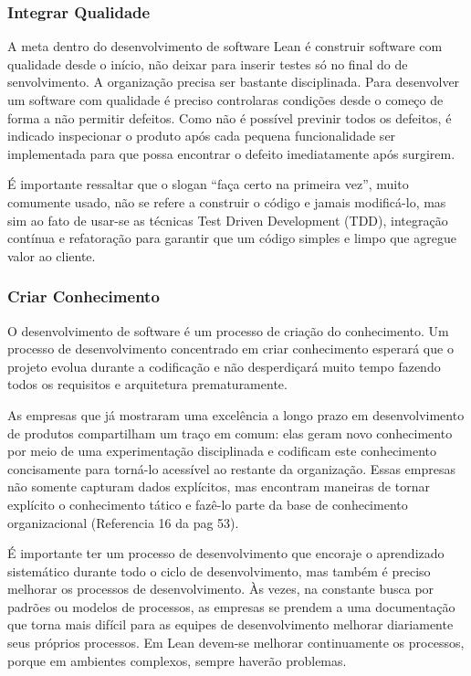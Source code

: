 \subsubsection[Integrar Qualidade]{Integrar Qualidade}

A meta dentro do desenvolvimento de software Lean é construir software com qualidade desde o início, não deixar para inserir testes só no final do de senvolvimento. A organização precisa ser bastante disciplinada. Para desenvolver um software com qualidade é preciso controlaras condições desde o começo de forma a não permitir defeitos. Como não é possível previnir todos os defeitos, é indicado inspecionar o produto após cada pequena funcionalidade ser implementada para que possa encontrar o defeito imediatamente após surgirem.

É importante ressaltar que o slogan “faça certo na primeira vez”, muito comumente usado, não se refere a construir o código e jamais modificá-lo, mas sim ao fato de usar-se as técnicas Test Driven Development (TDD), integração contínua e refatoração para garantir que um código simples e limpo que agregue valor ao cliente. 

\subsubsection[Criar Conhecimento]{Criar Conhecimento}

O desenvolvimento de software é um processo de criação do conhecimento.  Um processo de desenvolvimento concentrado em criar conhecimento esperará que o projeto evolua durante a codificação e não desperdiçará muito tempo fazendo todos os requisitos e arquitetura prematuramente. 

As empresas que já mostraram uma excelência a longo prazo em desenvolvimento de produtos compartilham um traço em comum: elas geram novo conhecimento por meio de uma experimentação disciplinada e codificam este conhecimento concisamente para torná-lo acessível ao restante da organização. Essas empresas não somente capturam dados explícitos, mas encontram maneiras de tornar explícito o conhecimento tático e fazê-lo parte da base de conhecimento organizacional (Referencia 16 da pag 53).

É importante ter um processo de desenvolvimento que encoraje o aprendizado sistemático durante todo o ciclo de desenvolvimento, mas também é preciso melhorar os processos de desenvolvimento. Às vezes, na constante busca por padrões ou modelos de processos, as empresas se prendem a uma documentação que torna mais difícil para as equipes de desenvolvimento melhorar diariamente seus próprios processos. Em Lean devem-se melhorar continuamente os processos, porque em ambientes complexos, sempre haverão problemas. 

